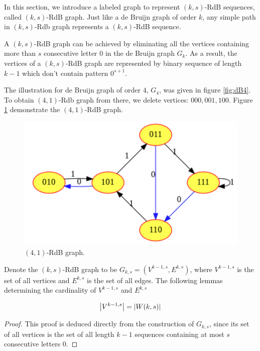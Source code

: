 In this section, we introduce a labeled graph to represent $(k,s)$-RdB sequences, called $(k,s)$-RdB graph. Just like a de Bruijn graph of order $k$, any simple path in $(k,s)$-Rdb graph represents a $(k,s)$-RdB sequence.

A $(k,s)$-RdB graph can be achieved by eliminating all the vertices containing more than $s$ consecutive letter $0$ in the de Bruijn graph $G_{k}$. As a result, the vertices of a $(k,s)$-RdB graph are represented by binary sequence of length $k-1$ which don't contain pattern $0^{s+1}$.

The illustration for de Bruijn graph of order $4$, $G_{4}$, was given in figure \ref{fig:dB4}. To obtain $(4,1)$-Rdb graph from there, we delete vertices: $000,001,100$. Figure \ref{fig:RdB_4_1} demonstrate the $(4,1)$-RdB graph.

\begin{figure}[htbp]
    \centering
    \includegraphics[scale=0.25]{fig/RdB41.png}
    \caption{$(4,1)$-RdB graph.}
    \label{fig:RdB_4_1}
\end{figure}

Denote the $(k,s)$-RdB graph to be $G_{k,s} = (V^{k-1,s},E^{k,s})$, where $V^{k-1,s}$ is the set of all vertices and $E^{k,s}$ is the set of all edges. The following lemmas determining the cardinality of $V^{k-1,s}$ and $E^{k,s}$

\begin{lemma}\label{lem:num_V}
    \begin{align}
        \left \lvert  V^{k-1,s} \right \rvert = \left \lvert  W(k,s) \right \rvert\label{eq:num_V}
    \end{align}
\end{lemma}
\begin{proof}
    This proof is deduced directly from the construction of $G_{k,s}$, since its set of all vertices is the set of all length $k-1$ sequences containing at most $s$ consecutive letters $0$. 
\end{proof}


